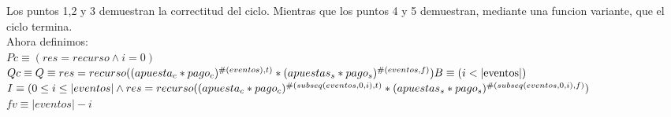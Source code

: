 \documentclass[10pt,a4paper]{article}
\begin{document}
Los puntos 1,2 y 3 demuestran la correctitud del ciclo. Mientras que los puntos 4 y 5 demuestran, mediante una funcion variante, que el ciclo termina. \\
Ahora definimos: \\
$Pc \equiv (res = recurso \wedge i = 0)$ \\
$Qc \equiv Q \equiv res = recurso((apuesta_c * pago_c)^{\#(eventos), t)} * (apuestas_s * pago_s)^{\#(eventos, f)})\\
B \equiv (i < |\text{eventos}|)$ \\
$I \equiv (0 \leq i \leq |eventos| \wedge \\ res = recurso((apuesta_c * pago_c)^{\#(subseq(eventos,0,i), t)} * (apuestas_s * pago_s)^{\#(subseq(eventos,0,i), f)})$ \\
${fv \equiv |eventos| - i}$ \\
\end{document}
